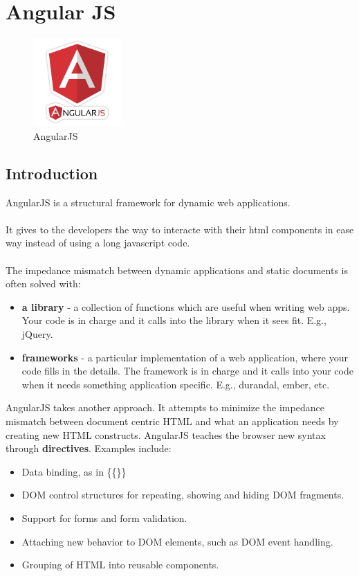 \documentclass[12pt]{article}
\begin{document}
\clearpage
\newpage

	\section{Angular JS}
		\begin{figure}[h]
		\centering
		\includegraphics[width=0.3\textwidth]{AngularJS_logo.png}
		\caption{AngularJS}
	\end{figure}
		\subsection{Introduction}
	AngularJS is a structural framework for dynamic web applications.
	\\
	\\
	It gives to the developers the way to interacte with their html components in ease way instead of using a long javascript code.
	\\
	\\
	The impedance mismatch between dynamic applications and static documents is often solved with:
	\begin{itemize}
		
		\item \textbf{a library} - a collection of functions which are useful when writing web apps. Your code is in charge and it calls into the library when it sees fit. E.g., \colorbox{mygray}{jQuery}.
		\item \textbf{frameworks} - a particular implementation of a web application, where your code fills in the details. The framework is in charge and it calls into your code when it needs something application specific. E.g., \colorbox{mygray}{durandal}, \colorbox{mygray}{ember}, etc.
	\end{itemize}
	AngularJS takes another approach. It attempts to minimize the impedance mismatch between document centric HTML and what an application needs by creating new HTML constructs. AngularJS teaches the browser new syntax through \textbf{directives}. Examples include:
	\begin{itemize}
		\item Data binding, as in \colorbox{mygray}{\{\{\}\}}
		\item DOM control structures for repeating, showing and hiding DOM fragments.
		\item Support for forms and form validation.
		\item Attaching new behavior to DOM elements, such as DOM event handling.
		\item Grouping of HTML into reusable components.	
	\end{itemize}
\end{document}

